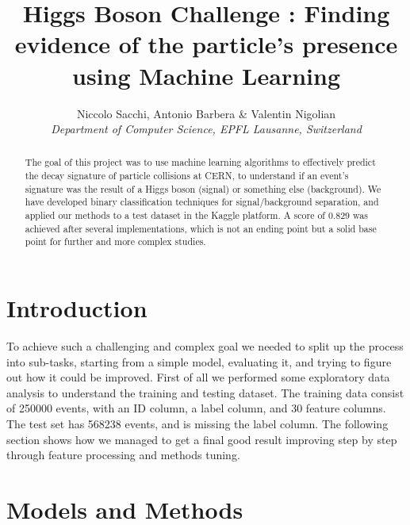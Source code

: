 \documentclass[10pt,conference,compsocconf]{IEEEtran}
\begin{document}
\title{Higgs Boson Challenge : Finding evidence of the particle's presence using Machine Learning}

\author{
  Niccolo Sacchi, Antonio Barbera \& Valentin Nigolian\\
  \textit{Department of Computer Science, EPFL Lausanne, Switzerland}
}

\maketitle

\begin{abstract}
  The goal of this project was to use machine learning algorithms to effectively predict the decay signature of particle collisions at CERN, to understand if an event's signature was the result of a Higgs boson (signal) or something else (background). We have developed binary classification techniques for signal/background separation, and applied our methods to a test dataset in the Kaggle platform.
  A score of 0.829 was achieved after several implementations, which is not an ending point but a solid base point for further and more complex studies.
\end{abstract}

\section{Introduction}

To achieve such a challenging and complex goal we needed to split up the process into sub-tasks, starting from a simple model, evaluating it, and trying to figure out how it could be improved.
First of all we performed some exploratory data analysis to understand the training and testing dataset. The training data consist of 250000 events, with an ID column, a label column, and 30 feature columns. The test set has 568238 events, and is missing the label column.
The following section shows how we managed to get a final good result improving step by step through feature processing and methods tuning.



\section{Models and Methods}
\label{sec:mod_meth}
\end{document}
